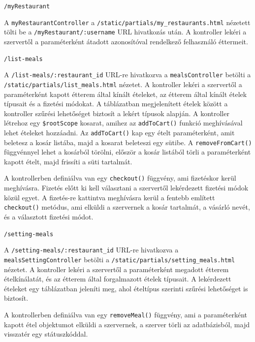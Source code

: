 \bigskip

\noindent \texttt{/myRestaurant}

A \texttt{myRestaurantController} a \texttt{/static/partials/my\_restaurants.html} nézetett tölti be a \texttt{/myRestaurant/:username} URL hivatkozás után. A kontroller lekéri a szervertől a paraméterként átadott azonosítóval rendelkező felhasználó éttermeit.

\bigskip

\noindent \texttt{/list-meals}

A \texttt{/list-meals/:restaurant\_id} URL-re hivatkozva a \texttt{mealsController} betölti a \texttt{/static/partials/list\_meals.html} nézetet. A kontroller lekéri a szervertől a paraméterként kapott étterem által kínált ételeket, az étterem által kínált ételek típusait és a fizetési módokat. A táblázatban megjelenített ételek között a kontroller szűrési lehetőséget biztosít a lekért típusok alapján. A kontroller létrehoz egy \texttt{\$rootScope} kosarat, amihez az \texttt{addToCart()} funkció meghívásával lehet ételeket hozzáadni. Az \texttt{addToCart()} kap egy ételt paraméterként, amit beletesz a kosár listába, majd a kosarat beleteszi egy sütibe. A \texttt{removeFromCart()} függvénnyel lehet a kosárból törölni, először a kosár listából törli a paraméterként kapott ételt, majd frissíti a süti tartalmát.

A kontrollerben definiálva van egy \texttt{checkout()} függvény, ami fizetéskor kerül meghívásra. Fizetés előtt ki kell választani a szervertől lekérdezett fizetési módok közül egyet. A fizetés-re kattintva meghívásra kerül a fentebb említett \texttt{checkout()} metódus, ami elküldi a szervernek a kosár tartalmát, a vásárló nevét, és a választott fizetési módot.

\bigskip

\noindent \texttt{/setting-meals}

A \texttt{/setting-meals/:restaurant\_id} URL-re hivatkozva a \texttt{meals\-Setting\-Control\-ler} betölti a \texttt{/static/partials/setting\_meals.html} nézetet. A kontroller lekéri a szervertől a paraméterként megadott étterem ételkínálatát, és az étterem által forgalmazott ételek típusait. A lekérdezett ételeket egy táblázatban jeleníti meg, ahol ételtípus szerinti szűrési lehetőséget is biztosít.

A kontrollerben definiálva van egy \texttt{removeMeal()} függvény, ami a paraméterként kapott étel objektumot elküldi a szervernek, a szerver törli az adatbázisból, majd visszatér egy státuszkóddal.

